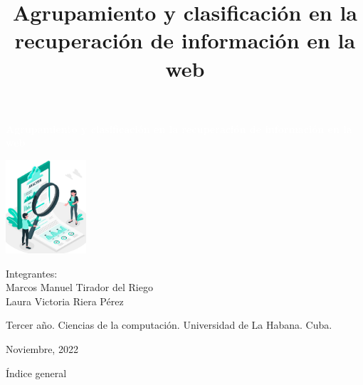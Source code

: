 \documentclass[t,compress,10pt,xcolor=dvipsnames]{beamer}
\title{\textbf{Agrupamiento y clasificaci\'on en la recuperaci\'on de informaci\'on en la web}}
\date{}
\begin{document}
	
	\begin{frame}
		\begin{center}
			\begin{block}{}
				\centering
				\Large\textcolor{white}{\textbf{Agrupamiento y clasificaci\'on en la recuperaci\'on de informaci\'on en la web}}
			\end{block}
		
		\vspace{0.5em}
		\includegraphics[width=3cm]{clustering.jpg}
		
		\vspace{0.5em}
		\footnotesize
		Integrantes:\\
			Marcos Manuel Tirador del Riego\\ 
			Laura Victoria Riera P\'erez
		
		\vspace{0.7em}
		\tiny	
		Tercer año. Ciencias de la computaci\'on. Universidad de La Habana. Cuba.
		
		\vspace{0.7em}
		\scriptsize
		Noviembre, 2022
		\end{center}
	\end{frame}

	\begin{frame}[allowframebreaks]{\'Indice general}
		\tableofcontents[sections={1}]
		\framebreak
		\tableofcontents[sections={2-4}]
	\end{frame}

\end{document}
